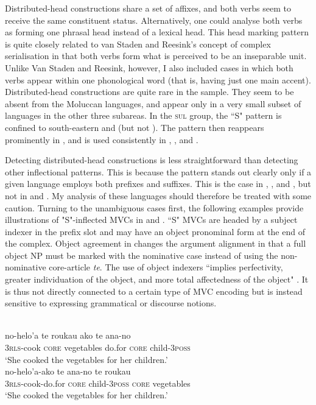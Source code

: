 Distributed-head constructions share a set of affixes, and both verbs seem to receive the same constituent status. Alternatively, one could analyse both verbs as forming one phrasal head instead of a lexical head. This head marking pattern is quite closely related to van Staden and Reesink's concept of complex serialisation in that both verbs form what is perceived to be an inseparable unit. Unlike Van Staden and Reesink, however, I also included cases in which both verbs appear within one phonological word (that is, having just one main accent). Distributed-head constructions are quite rare in the sample. They seem to be absent from the Moluccan languages, and appear only in a very small subset of languages in the other three subareas. In the \textsc{sul} group, the ``S" pattern is confined to south-eastern  and  (but not ). The pattern then reappears prominently in , and is used consistently in , , and .

Detecting distributed-head constructions is less straightforward than detecting other inflectional patterns. This is because the pattern stands out clearly only if a given language employs both prefixes and suffixes. This is the case in , , and , but not in  and . My analysis of these languages should therefore be treated with some caution. Turning to the unambiguous cases first, the following examples provide illustrations of "S"-inflected MVCs in  and .  ``S" MVCs are headed by a subject indexer in the prefix slot and may have an object pronominal form at the end of the complex. Object agreement in  changes the argument alignment in that a full object NP must be marked with the nominative case instead of using the non-nominative core-article \textit{te}. The use of object indexers ``implies perfectivity, greater individuation of the object, and more total affectedness of the object" \citep[135]{donohue1999}. It is thus not directly connected to a certain type of MVC encoding but is instead sensitive to expressing grammatical or discourse notions.

\ea \label{tukang001}
\\
\ea
\gll no-helo'a te roukau ako te ana-no \\
3\textsc{rls}-cook \textsc{core} vegetables do.for \textsc{core} child-3\textsc{poss} \\
\glft `She cooked the vegetables for her children.' \\ 
\ex \label{tukang001b}
\gll no-helo'a-ako te ana-no te roukau \\ 
3\textsc{rls}-cook-do.for \textsc{core} child-3\textsc{poss} \textsc{core} vegetables \\
\glft `She cooked the vegetables for her children.' \\ 
\z
\z

